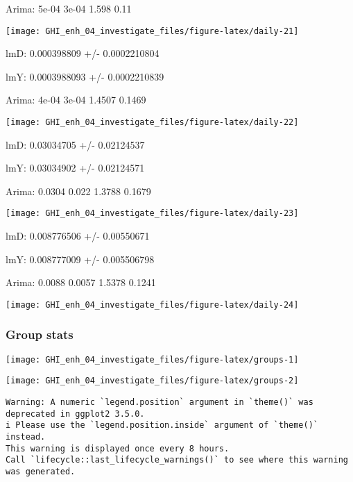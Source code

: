 \documentclass[
  10pt,
  a4paper,oneside]{article}
\begin{document}
Arima: 5e-04 3e-04 1.598 0.11

\begin{center}\texttt{[image: GHI\_enh\_04\_investigate\_files/figure-latex/daily-21]} \end{center}

lmD: 0.000398809 +/- 0.0002210804

lmY: 0.0003988093 +/- 0.0002210839

Arima: 4e-04 3e-04 1.4507 0.1469

\begin{center}\texttt{[image: GHI\_enh\_04\_investigate\_files/figure-latex/daily-22]} \end{center}

lmD: 0.03034705 +/- 0.02124537

lmY: 0.03034902 +/- 0.02124571

Arima: 0.0304 0.022 1.3788 0.1679

\begin{center}\texttt{[image: GHI\_enh\_04\_investigate\_files/figure-latex/daily-23]} \end{center}

lmD: 0.008776506 +/- 0.00550671

lmY: 0.008777009 +/- 0.005506798

Arima: 0.0088 0.0057 1.5378 0.1241

\begin{center}\texttt{[image: GHI\_enh\_04\_investigate\_files/figure-latex/daily-24]} \end{center}

\newpage
\FloatBarrier

\hypertarget{group-stats}{%
\subsubsection{Group stats}\label{group-stats}}

\begin{center}\texttt{[image: GHI\_enh\_04\_investigate\_files/figure-latex/groups-1]} \end{center}

\begin{center}\texttt{[image: GHI\_enh\_04\_investigate\_files/figure-latex/groups-2]} \end{center}

\begin{verbatim}
Warning: A numeric `legend.position` argument in `theme()` was deprecated in ggplot2 3.5.0.
i Please use the `legend.position.inside` argument of `theme()` instead.
This warning is displayed once every 8 hours.
Call `lifecycle::last_lifecycle_warnings()` to see where this warning was generated.
\end{verbatim}
\end{document}

